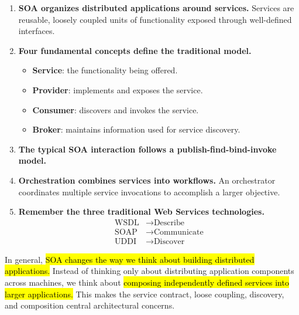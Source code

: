 \highspace
\begin{takeawaysbox}
    \begin{enumerate}
        \item \textbf{SOA organizes distributed applications around services.} Services are reusable, loosely coupled units of functionality exposed through well-defined interfaces.

        \item \textbf{Four fundamental concepts define the traditional model.}
            \begin{itemize}
                \item \textbf{Service}: the functionality being offered.
                \item \textbf{Provider}: implements and exposes the service.
                \item \textbf{Consumer}: discovers and invokes the service.
                \item \textbf{Broker}: maintains information used for service discovery.
            \end{itemize}

        \item \textbf{The typical SOA interaction follows a publish-find-bind-invoke model.}

        \item \textbf{Orchestration combines services into workflows.} An orchestrator coordinates multiple service invocations to accomplish a larger objective.

        \item \textbf{Remember the three traditional Web Services technologies.}
            \begin{equation*}
                \begin{aligned}
                    \text{WSDL} &\rightarrow \text{Describe}\\
                    \text{SOAP} &\rightarrow \text{Communicate}\\
                    \text{UDDI} &\rightarrow \text{Discover}
                \end{aligned}
            \end{equation*}
    \end{enumerate}
    In general, \hl{SOA changes the way we think about building distributed applications.} Instead of thinking only about distributing application components across machines, we think about \hl{composing independently defined services into larger applications.} This makes the service contract, loose coupling, discovery, and composition central architectural concerns.
\end{takeawaysbox}